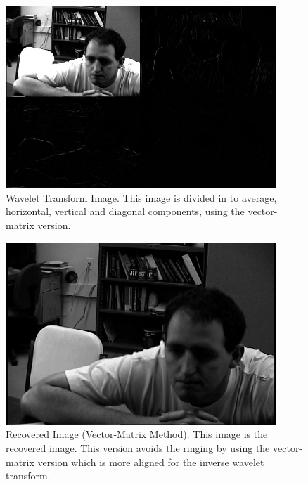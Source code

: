 \begin{figure}[htb]
\begin{center}
\includegraphics [width=4in]{selfWavepic.jpg}
\end{center}
\caption{Wavelet Transform Image.  This image is divided in to average, horizontal, vertical and diagonal components, using the vector-matrix version. }
\label{wavepic}
\end{figure}

\begin{figure}[htb]
\begin{center}
\includegraphics [width=4in]{selfRecover.jpg}
\end{center}
\caption{Recovered Image (Vector-Matrix Method).  This image is the recovered image.  This version avoids the ringing by using the vector-matrix version which is more aligned for the inverse wavelet transform.  }
\label{selfRecover}
\end{figure}


